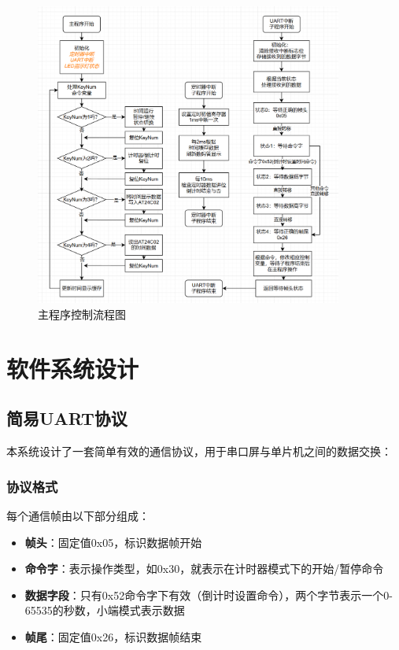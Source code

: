 \documentclass[12pt,hyperref,a4paper,UTF8]{ctexart}
\begin{document}
\begin{figure}[H]
    \centering
    \includegraphics[width=0.9\textwidth]{figures/3.png} %
    \caption{主程序控制流程图}
    \label{fig:hardware-connection}
\end{figure}

\section{软件系统设计}

\subsection{简易UART协议}

本系统设计了一套简单有效的通信协议，用于串口屏与单片机之间的数据交换：

\subsubsection{协议格式}

每个通信帧由以下部分组成：
\begin{itemize}
  \item \textbf{帧头}：固定值0x05，标识数据帧开始
  \item \textbf{命令字}：表示操作类型，如0x30，就表示在计时器模式下的开始/暂停命令
  \item \textbf{数据字段}：只有0x52命令字下有效（倒计时设置命令），两个字节表示一个0-65535的秒数，小端模式表示数据
  \item \textbf{帧尾}：固定值0x26，标识数据帧结束
\end{itemize}
\end{document}
